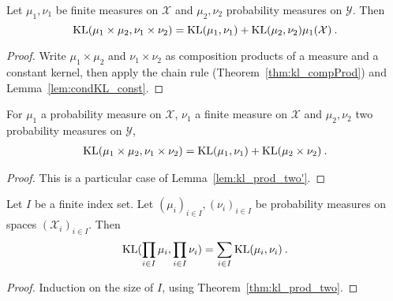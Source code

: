 \begin{lemma}
  \label{lem:kl_prod_two'}
  \leanok
  Let $\mu_1, \nu_1$ be finite measures on $\mathcal X$ and $\mu_2, \nu_2$ probability measures on $\mathcal{Y}$. Then
  $$\operatorname{KL}(\mu_1\times \mu_2, \nu_1 \times \nu_2) = \operatorname{KL}(\mu_1, \nu_1) + \operatorname{KL}(\mu_2, \nu_2) \mu_1 (\mathcal X) \: .$$
\end{lemma}

\begin{proof} \leanok
{}
Write $\mu_1 \times \mu_2$ and $\nu_1 \times \nu_2$ as composition products of a measure and a constant kernel, then apply the chain rule (Theorem~\ref{thm:kl_compProd}) and Lemma~\ref{lem:condKL_const}.
\end{proof}
 
\begin{theorem}[Tensorization]
  \label{thm:kl_prod_two}
  \leanok
  For $\mu_1$ a probability measure on $\mathcal X$, $\nu_1$ a finite measure on $\mathcal{X}$ and $\mu_2, \nu_2$ two probability measures on $\mathcal Y$,
  \begin{align*}
  \operatorname{KL}(\mu_1 \times \mu_2, \nu_1 \times \nu_2) = \operatorname{KL}(\mu_1, \nu_1) + \operatorname{KL}(\mu_2 \times \nu_2) \: .
  \end{align*}
\end{theorem}

\begin{proof} \leanok
{}
This is a particular case of Lemma~\ref{lem:kl_prod_two'}.
\end{proof}

\begin{theorem}
  \label{thm:kl_pi}
  \leanok
  Let $I$ be a finite index set. Let $(\mu_i)_{i \in I}, (\nu_i)_{i \in I}$ be probability measures on spaces $(\mathcal X_i)_{i \in I}$. Then
  \begin{align*}
  \operatorname{KL}(\prod_{i \in I} \mu_i, \prod_{i \in I} \nu_i) = \sum_{i \in I} \operatorname{KL}(\mu_i, \nu_i)
  \: .
  \end{align*}
\end{theorem}

\begin{proof} \leanok
{}
Induction on the size of $I$, using Theorem~\ref{thm:kl_prod_two}.
\end{proof}

